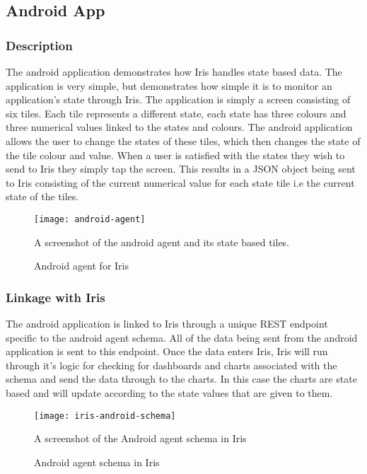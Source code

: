 \documentclass[12pt,a4paper,titlepage]{report}
\begin{document}
\subsection{Android App}
\subsubsection{Description}
The android application demonstrates how Iris handles state based data. The application is very simple, but demonstrates how simple it is to monitor an application's state through Iris. The application is simply a screen consisting of six tiles. Each tile represents a different state, each state has three colours and three numerical values linked to the states and colours. The android application allows the user to change the states of these tiles, which then changes the state of the tile colour and value. When a user is satisfied with the states they wish to send to Iris they simply tap the screen. This results in a JSON object being sent to Iris consisting of the current numerical value for each state tile i.e the current state of the tiles.
\begin{figure}[H]
\begin{tcolorbox}
\begin{center}
\texttt{[image: android-agent]}
\end{center}
A screenshot of the android agent and its state based tiles.
\end{tcolorbox}
\caption{Android agent for Iris}
\end{figure}

\subsubsection{Linkage with Iris}
The android application is linked to Iris through a unique REST endpoint specific to the android agent schema. All of the data being sent from the android application is sent to this endpoint. Once the data enters Iris, Iris will run through it's logic for checking for dashboards and charts associated with the schema and send the data through to the charts. 
In this case the charts are state based and will update according to the state values that are given to them.

\begin{figure}[H]
\begin{tcolorbox}
\begin{center}
\texttt{[image: iris-android-schema]}
\end{center}
A screenshot of the Android agent schema in Iris
\end{tcolorbox}
\caption{Android agent schema in Iris}
\end{figure}
\end{document}
